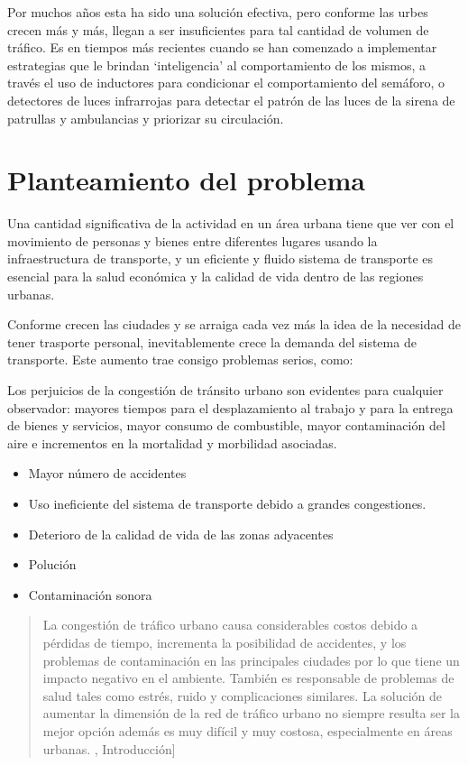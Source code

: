 Por muchos años esta ha sido una solución efectiva, pero conforme las
urbes crecen más y más, llegan a ser insuficientes para tal cantidad de
volumen de tráfico. Es en tiempos más recientes cuando se han comenzado
a implementar estrategias que le brindan `inteligencia' al
comportamiento de los mismos, a través el uso de inductores para
condicionar el comportamiento del semáforo, o detectores de luces
infrarrojas para detectar el patrón de las luces de la sirena de
patrullas y ambulancias y priorizar su circulación.

\hypertarget{planteamiento-del-problema}{%
\section{Planteamiento del problema}\label{planteamiento-del-problema}}

Una cantidad significativa de la actividad en un área urbana tiene que
ver con el movimiento de personas y bienes entre diferentes lugares
usando la infraestructura de transporte, y un eficiente y fluido sistema
de transporte es esencial para la salud económica y la calidad de vida
dentro de las regiones urbanas. \cite[p. 3]{Patriksson2012}

Conforme crecen las ciudades y se arraiga cada vez más la idea de la
necesidad de tener trasporte personal, inevitablemente crece la demanda
del sistema de transporte. Este aumento trae consigo problemas serios,
como:

Los perjuicios de la congestión de tránsito urbano son evidentes para
cualquier observador: mayores tiempos para el desplazamiento al trabajo
y para la entrega de bienes y servicios, mayor consumo de combustible,
mayor contaminación del aire e incrementos en la mortalidad y morbilidad
asociadas. \cite[p. 2]{Medina-Durango2011}

\begin{itemize}
\item
  Mayor número de accidentes
\item
  Uso ineficiente del sistema de transporte debido a grandes
  congestiones.
\item
  Deterioro de la calidad de vida de las zonas adyacentes
\item
  Polución
\item
  Contaminación sonora
\end{itemize}

\cite{Patriksson2012}

\begin{quote}
La congestión de tráfico urbano causa considerables costos debido a
pérdidas de tiempo, incrementa la posibilidad de accidentes, y los
problemas de contaminación en las principales ciudades por lo que tiene
un impacto negativo en el ambiente. También es responsable de problemas
de salud tales como estrés, ruido y complicaciones similares. La
solución de aumentar la dimensión de la red de tráfico urbano no siempre
resulta ser la mejor opción además es muy difícil y muy costosa,
especialmente en áreas urbanas. \cite{JoelTrejo2006}, Introducción{]}
\end{quote}

